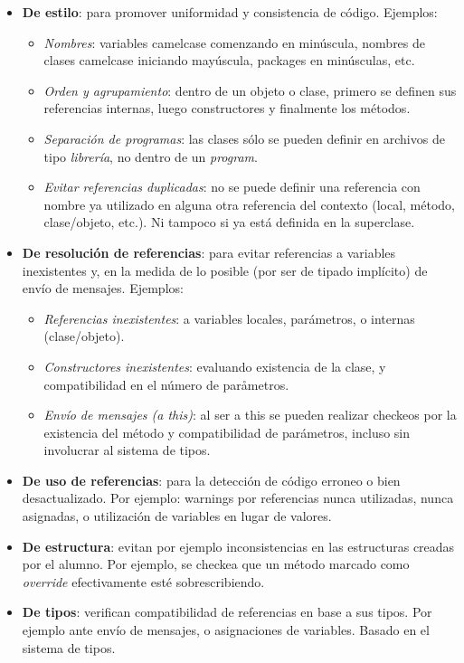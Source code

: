 \begin{itemize}
  \item \textbf{De estilo}: para promover uniformidad y consistencia de código.
  Ejemplos:
  		\begin{itemize}
  			\item \textit{Nombres}: variables camelcase comenzando en minúscula,
  			nombres de clases camelcase iniciando mayúscula, packages en minúsculas, etc.
  			\item \textit{Orden y agrupamiento}: dentro de un objeto o clase, primero
  			se definen sus referencias internas, luego constructores y finalmente los métodos.
  			\item \textit{Separación de programas}: las clases sólo se pueden definir
  			en archivos de tipo \textit{librería}, no dentro de un \textit{program}.
  			\item \textit{Evitar referencias duplicadas}: no se puede definir una
  			referencia con nombre ya utilizado en alguna otra referencia del contexto (local, método,
  			clase/objeto, etc.). Ni tampoco si ya está definida en la superclase.
		\end{itemize}
  \item \textbf{De resolución de referencias}: para evitar referencias a
  variables inexistentes y, en la medida de lo posible (por ser de tipado
  implícito) de envío de mensajes. Ejemplos:
  		\begin{itemize}
		  \item \textit{Referencias inexistentes}: a variables locales, parámetros, o
		  internas (clase/objeto).
		  \item \textit{Constructores inexistentes}: evaluando existencia de la
		  clase, y compatibilidad en el número de paråmetros.
		  \item \textit{Envío de mensajes (a this)}: al ser a this se pueden realizar
		  checkeos por la existencia del método y compatibilidad de parámetros, incluso sin
		  involucrar al sistema de tipos.
		\end{itemize}
  \item \textbf{De uso de referencias}: para la detección de código
  	erroneo o bien desactualizado. Por ejemplo: warnings por referencias nunca
 	utilizadas, nunca asignadas, o utilización de variables en lugar de valores.
  \item \textbf{De estructura}: evitan por ejemplo inconsistencias en las
  estructuras creadas por el alumno. Por ejemplo, se checkea
  que un método marcado como \textit{override} efectivamente esté
	sobrescribiendo.
  \item \textbf{De tipos}: verifican compatibilidad de referencias en base a sus
  tipos. Por ejemplo ante envío de mensajes, o asignaciones de variables. Basado
  en el sistema de tipos.
\end{itemize}


